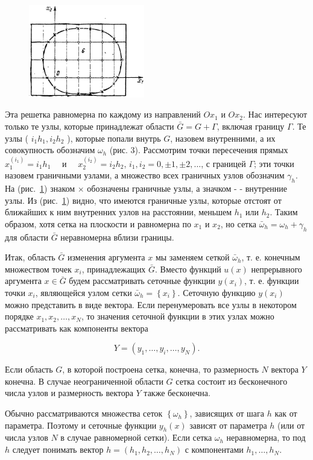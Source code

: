 \begin{figure}
	\centering
	\includegraphics[width=0.45\textwidth]{img/3.png}
	\caption{}
	\label{fig:3}
\end{figure}

Эта решетка равномерна по каждому из направлений $O x_1$ и $O x_2$. Нас интересуют только те узлы, которые принадлежат области $\bar{G}=G+\Gamma$, включая границу $\Gamma$. Те узлы ( $i_1 h_1, i_2 h_2$ ), которые попали внутрь $G$, назовем внутренними, а их совокупность обозначим $\omega_h$ (рис. 3). Рассмотрим точки пересечения прямых $x_1^{\left(i_1\right)}=i_1 h_1 \quad$ и $\quad x_2^{\left(i_2\right)}=i_2 h_2$, $i_1, i_2=0, \pm 1, \pm 2, \ldots$, с границей $\Gamma$; эти точки назовем граничными узлами, а множество всех граничных узлов обозначим $\gamma_h$. На (рис.~\ref{fig:3})  знаком $\times$ обозначены граничные узлы, а значком - - внутренние узлы. Из (рис.~\ref{fig:3})  видно, что имеются граничные узлы, которые отстоят от ближайших к ним внутренних узлов на расстоянии, меньшем $h_1$ или $h_2$. Таким образом, хотя сетка на плоскости и равномерна по $x_1$ и $x_2$, но сетка $\bar{\omega}_h=\omega_h+\gamma_h$ для области $\bar{G}$ неравномерна вблизи границы.

Итак, область $\bar{G}$ изменения аргумента $x$ мы заменяем сеткой $\bar{\omega}_h$, т. е. конечным множеством точек $x_i$, принадлежащих $\bar{G}$. Вместо функций $u(x)$ непрерывного аргумента $x \in \bar{G}$ будем рассматривать сеточные функции $y\left(x_i\right)$, т. е. функции точки $x_i$, являющейся узлом сетки $\bar{\omega}_h=\left\{x_i\right\}$. Сеточную функцию $y\left(x_i\right)$ можно представить в виде вектора. Если перенумеровать все узлы в некотором порядке $x_1, x_2, \ldots, x_N$, то значения сеточной функции в этих узлах можно рассматривать как компоненты вектора

$$
Y=\left(y_1, \ldots, y_i, \ldots, y_N\right) .
$$

Если область $G$, в которой построена сетка, конечна, то размерность $N$ вектора $Y$ конечна. В случае неограниченной области $G$ сетка состоит из бесконечного числа узлов и размерность вектора $Y$ также бесконечна.

Обычно рассматриваются множества сеток $\left\{\omega_h\right\}$, зависящих от шага $h$ как от параметра. Поэтому и сеточные функции $y_h(x)$ зависят от параметра $h$ (или от числа узлов $N$ в случае равномерной сетки). Если сетка $\omega_h$ неравномерна, то под $h$ следует понимать вектор $h=\left(h_1, h_2, \ldots, h_N\right)$ с компонентами $h_1, \ldots, h_N$.
